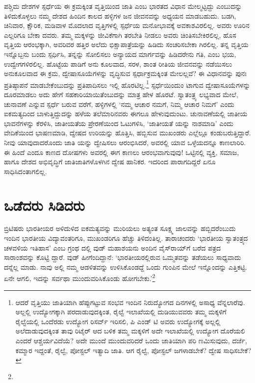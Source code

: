 ಪಶ್ಚಿಮ ದೇಶಗಳ ಸ್ಪರ್ಧೆಯ ಈ ಕ್ರಮಕ್ಕಿಂತ ವೃತ್ತಿಯಿಂದ ಜಾತಿ ಎಂಬ ಭಾರತದ ವಿಧಾನ ಮೇಲ್ಮಟ್ಟದ್ದು ಎಂಬುದನ್ನು ತಿಳಿದುಕೊಳ್ಳಲು ನಮ್ಮ ದೇಶದ ಹಿಂದಿನ ಕಾಲದ ಹಳ್ಳಿಗಳ ಜನ ಜೀವನವನ್ನು ಅಧ್ಯಯನ ಮಾಡಬಹುದು. ಬಡಗಿ, ಚಿನಿವಾರ, ಕ್ಷೌರಿಕ, ಮಡಿವಾಳ ಮೊದಲಾದ ವೃತ್ತಿಗಳಲ್ಲಿ ಸ್ಪರ್ಧೆಯ ಮನೋಭಾವಕ್ಕೆ ಅವಕಾಶವಿರಲಿಲ್ಲ. ಅವರು ಊರಿನ ಎಲ್ಲರಿಗೂ ಬೇಕಾ ದವರು. ತಮ್ಮ ಮಕ್ಕಳನ್ನು ಜೀವಿಕೆಗಾಗಿ ತರಬೇತಿ ನೀಡಲು ಅವರು ಚಿಂತಿಸಬೇಕಿರಲಿಲ್ಲ, ಹೊಸ ವೃತ್ತಿಯ ಆರಂಭಕ್ಕಾಗಿ, ಅವರಿವರ ಹತ್ತಿರ ಅಲೆದು ಭಿಕ್ಷಾಪಾತ್ರೆಯನ್ನು ಹಿಡಿದು ಸಂಚರಿಸಬೇಕಾ ಗಿರಲಿಲ್ಲ. ತನ್ನ ವೃತ್ತಿಯ ಇನ್ನೊಬ್ಬನು ಬಂದು ಸ್ಪರ್ಧಿಸಿ, ತನ್ನನ್ನು ಸೋಲಿಸಲು ಅನ್ಯಾಯದ ಮಾರ್ಗವನ್ನು ಹಿಡಿದರೇನು ಗತಿ, ಎಂಬ ಭಯ, ಉದ್ವೇಗಗಳಿರಲಿಲ್ಲ. ಹೊಟ್ಟೆಯ ಪಾಡಿಗೆ ಅನು ಕೂಲವಾದ, ಸರಳ, ಶಾಂತ ರೀತಿಯ ಜೀವನವನ್ನು ನಡೆಯಿಸಲು ಅನುಕೂಲವಾದ ಈ ಕ್ರಮ, ದ್ವೇಷಾಸೂಯೆಗಳನ್ನು ವೃದ್ಧಿಸುವ ಸ್ಪರ್ಧಾಕ್ರಮಕ್ಕಿಂತ ಮೇಲಲ್ಲವೆ? ಈ ವಿಧಾನವನ್ನು ಪುನಃ ಪ್ರತಿಷ್ಠಾಪನೆ ಮಾಡಬೇಕೆಂಬುದನ್ನು ಪ್ರತಿಪಾದಿಸಲು ಇಲ್ಲಿ ಹೊರಟಿಲ್ಲ.\footnote{ಆದರೆ ವೃತ್ತಿಯು ಜಾತಿಯಾಗಿ ಹೆಪ್ಪುಗಟ್ಟುವ ಸಂಭವ ಇಂದಿನ ನಿರುದ್ಯೋಗದ ದಿನಗಳಲ್ಲಿ ಅಸಾಧ್ಯ ವೆನ್ನಲಾರೆವು. ಅಲ್ಲಲ್ಲಿ ಉದ್ಯೋಗಕ್ಕಾಗಿ ಪರದಾಡುವುದಕ್ಕಿಂತ, ರೈಲ್ವೆ ಇಲಾಖೆಯಲ್ಲಿ ದುಡಿಯುವವರು ತಮ್ಮ ಮಕ್ಕಳಿಗೆ ರೈಲ್ವೆಯಲ್ಲಿ ಒಂದೆರಡು ಉದ್ಯೋಗ ರಿಸರ್ವ್ ಇರಿಸಲಿ, ಪಿ ಎಂಡ್ ಟಿ ಅವರು ಉದ್ಯೋಗಕ್ಕೆ ಅಲ್ಲಲ್ಲಿ ಅಲೆದಾಡುವುದಕ್ಕಿಂತ ತಾವು ರಿಟೈರ್ ಆದ ಬಳಿಕ ತಮ್ಮ ಮಕ್ಕಳಿಗೆ ಅದೇ ಇಲಾಖೆಯಲ್ಲಿ ಉದ್ಯೋಗ ದೊರೆಯಲಿ ಎಂದರೆ ಆಶ್ಚರ್ಯವಿದೆಯೆ? ಅದೇ ಮುಂದೆ ಮುಂದುವರಿದರೆ ಒಂದು ಜಾತಿಯಾಗಿ ಪರಿ ಣಮಿಸುವುದು, ದರ್ಜೆ, ಕಮ್ಮಾರ ಇದ್ದಂತೆ, ರೈಲ್ವೆ, ಪೋಸ್ಟಲ್ ಇತ್ಯಾದಿ ಜಾತಿ. ಆಗ ರೈಲ್ವೆ, ಪೋಸ್ಟಲ್ ಜಗಳಾಡಬೇಕೆ? ದ್ವೇಷ ಸಾಧಿಸಬೇಕೆ?} ಸ್ಪರ್ಧೆಯಿಂದುಂ ಟಾಗುವ ದ್ವೇಷಾಸೂಯೆಗಳನ್ನು ದೂರಮಾಡಲು ಅದು ಹೇಗೆ ಸಹಕಾರಿಯಾಯಿತೆಂಬುದನ್ನು ಮಾತ್ರ ಹೇಳ ಹೊರಟೆ. ಸ್ವಾತಂತ್ರ್ಯ ಲಭ್ಯವಾದ ಮೇಲೆ, ಚುನಾವಣೆ ಎನ್ನುವ ಸ್ಪರ್ಧೆ ಬರುವ ವರೆಗೆ, ಹಳ್ಳಿಗಳಲ್ಲಿ ‘ನಮ್ಮ ಆಚಾರ ನಮಗೆ, ನಿಮ್ಮ ಆಚಾರ ನಿಮಗೆ’ ಎಂದು ಐಕಮತ್ಯದಿಂದ ಬಾಳುತ್ತಿದ್ದುದನ್ನು ಹಳೆಯ ತಲೆಮಾರಿನವರು ಈಗಲೂ ಹೇಳುವುದುಂಟು. ಚುನಾವಣೆಯಲ್ಲಿ ಜಾತೀಯ ಭಾವನೆಗಳನ್ನು ಕೆರಳಿಸಿ, ಜಾತೀಯತೆಯ ಪ್ರೇರಣೆಯಿಂದ ಓಟುಗಳಿಸಿ, ‘ಜಾತೀಯತೆ ಯನ್ನು ನಾಶಮಾಡಿ’ ಎಂದು ವೇದಿಕೆಯಿಂದ ಭಾಷಣಮಾಡಿ, ದ್ವೇಷದ ಉರಿಯನ್ನು ಹೊತ್ತಿಸಿ, ಹಬ್ಬಿಸುವ ಮುಖಂಡರು ಎಲ್ಲೆಲ್ಲೂ ಕಂಡುಬರುತ್ತಿದ್ದಾರೆ. ನೀವು ಯಾವುದಾದರೊಂದು ಜಾತಿ ಯನ್ನು ದ್ವೇಷಿಸಲು ಆರಂಭಿಸಿದರೆ, ಅವರಲ್ಲಿ ಯಾವ ಒಳ್ಳೆಯದನ್ನೂ ಕಾಣಲಾರಿರಿ. ಈ ಹಿಂದೆ ಎಂದೂ ಕಾಣದ ದೋಷಗಳು ಅವರಲ್ಲಿ ಈಗ ಕಾಣಲು ಆರಂಭವಾಗುವುವು! ಒಟ್ಟಿನಲ್ಲಿ ವ್ಯಕ್ತಿ, ಸಮಾಜ, ಹಾಗೂ ದೇಶದ ಅಭಿವೃದ್ಧಿಗೆ ಜಾತಿಜಾತಿಗಳೊಳಗಿನ ದ್ವೇಷ ಹಾನಿಕರ. ಇದರಿಂದ ಪಾರಾಗದಿದ್ದರೆ ಏನೂ ಸಾಧಿಸಿದಂತಾಗಲಿಲ್ಲ.


\section{ಒಡೆದರು ಸಿಡಿದರು}

ಬ್ರಿಟಿಷರು ಭಾರತೀಯರ ಅಳಿದುಳಿದ ಐಕಮತ್ಯವನ್ನು ಮುರಿಯಲು ಅತ್ಯಂತ ಸೂಕ್ಷ್ಮ ಜಾಲವನ್ನು ಹಬ್ಬಿದರೆಂಬುದು ಇಂದಿನ ಭಾರತೀಯ ವಿದ್ಯಾವಂತರಿಗೂ, ಮುಖಂಡರಿಗೂ ಹೆಚ್ಚು ತಿಳಿದಂತಿಲ್ಲ. ತಾರಾಚಂದರು ‘ಭಾರತೀಯ ಸ್ವಾತಂತ್ರ್ಯದ ಚಳವಳಿಯ ಇತಿಹಾಸ’ ಎಂಬ ಗ್ರಂಥ ದಲ್ಲಿ ವುಡ್ ಮಹಾಶಯನು ಅಂದಿನ ವೈಸ್​ರಾಯ್​ಗೆ ಬರೆದ ಪತ್ರದ ಸಾರಾಂಶವನ್ನು ಕೊಟ್ಟಿ ದ್ದಾರೆ. ವುಡ್ ಹೀಗೆಂದಿದ್ದಾನೆ: ‘ಭಾರತೀಯರಲ್ಲಿರುವ ಒಮ್ಮತವನ್ನು ತಡೆಯಲು ಸಾಧ್ಯವಾದು ದನ್ನೆಲ್ಲ ಮಾಡು. ನಾವು ಅಲ್ಲಿ ನಮ್ಮ ಆಡಳಿತವನ್ನು ಉಳಿಸಿಕೊಂಡದ್ದೆ ಒಂದು ಗುಂಪಿನ ಮೇಲೆ ಇನ್ನೊಂದನ್ನು ಎತ್ತಿಕಟ್ಟಿ. ಏನೇ ಆಗಲಿ, ಇದನ್ನು ಸರ್ವಥಾ ಮುಂದುವರಿಸಿಕೊಂಡು ಹೋಗಬೇಕು.’\footnote{}

